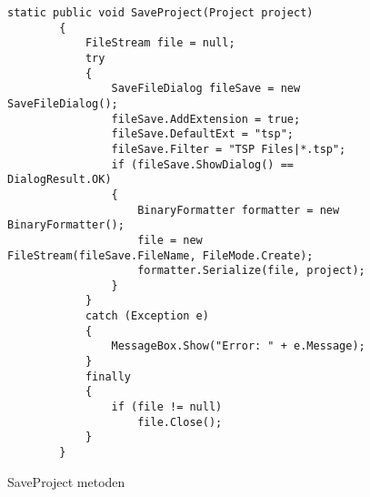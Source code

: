 \begin{figure}[H]
\begin{lstlisting}
static public void SaveProject(Project project)
        { 
            FileStream file = null;
            try
            {
                SaveFileDialog fileSave = new SaveFileDialog();
                fileSave.AddExtension = true;
                fileSave.DefaultExt = "tsp";
                fileSave.Filter = "TSP Files|*.tsp";
                if (fileSave.ShowDialog() == DialogResult.OK)
                {
                    BinaryFormatter formatter = new BinaryFormatter();
                    file = new FileStream(fileSave.FileName, FileMode.Create);
                    formatter.Serialize(file, project);
                }
            }
            catch (Exception e)
            {
                MessageBox.Show("Error: " + e.Message);
            }
            finally
            {
                if (file != null)
                    file.Close();
            }
        }
\end{lstlisting}
\caption{SaveProject metoden}\label{SaveProjectCode}
\end{figure}